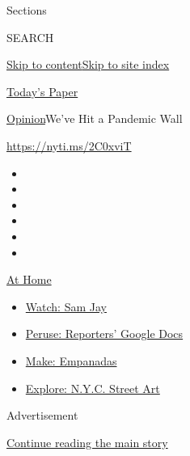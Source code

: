 Sections

SEARCH

\protect\hyperlink{site-content}{Skip to
content}\protect\hyperlink{site-index}{Skip to site index}

\href{https://myaccount.nytimes.com/auth/login?response_type=cookie\&client_id=vi}{}

\href{https://www.nytimes.com/section/todayspaper}{Today's Paper}

\href{/section/opinion}{Opinion}\textbar{}We've Hit a Pandemic Wall

\href{https://nyti.ms/2C0xviT}{https://nyti.ms/2C0xviT}

\begin{itemize}
\item
\item
\item
\item
\item
\item
\end{itemize}

\href{https://www.nytimes.com/spotlight/at-home?action=click\&pgtype=Article\&state=default\&region=TOP_BANNER\&context=at_home_menu}{At
Home}

\begin{itemize}
\tightlist
\item
  \href{https://www.nytimes.com/2020/08/04/arts/television/sam-jay-netflix-special.html?action=click\&pgtype=Article\&state=default\&region=TOP_BANNER\&context=at_home_menu}{Watch:
  Sam Jay}
\item
  \href{https://www.nytimes.com/interactive/2020/at-home/even-more-reporters-editors-diaries-lists-recommendations.html?action=click\&pgtype=Article\&state=default\&region=TOP_BANNER\&context=at_home_menu}{Peruse:
  Reporters' Google Docs}
\item
  \href{https://www.nytimes.com/2020/08/04/dining/colombian-empanadas-carlos-gaviria.html?action=click\&pgtype=Article\&state=default\&region=TOP_BANNER\&context=at_home_menu}{Make:
  Empanadas}
\item
  \href{https://www.nytimes.com/2020/08/06/arts/design/street-art-nyc-george-floyd.html?action=click\&pgtype=Article\&state=default\&region=TOP_BANNER\&context=at_home_menu}{Explore:
  N.Y.C. Street Art}
\end{itemize}

Advertisement

\protect\hyperlink{after-top}{Continue reading the main story}

